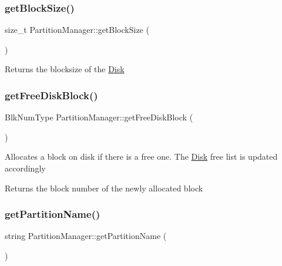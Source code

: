 \subsubsection{\texorpdfstring{get\+Block\+Size()}{getBlockSize()}}
{\footnotesize\ttfamily size\+\_\+t Partition\+Manager\+::get\+Block\+Size (\begin{DoxyParamCaption}{ }\end{DoxyParamCaption})}

\begin{DoxyReturn}{Returns}
the blocksize of the \mbox{\hyperlink{class_disk}{Disk}} 
\end{DoxyReturn}
\mbox{\label{class_partition_manager_a682ce5963a31cf7009455cb1c229b26a}} 
\subsubsection{\texorpdfstring{get\+Free\+Disk\+Block()}{getFreeDiskBlock()}}
{\footnotesize\ttfamily Blk\+Num\+Type Partition\+Manager\+::get\+Free\+Disk\+Block (\begin{DoxyParamCaption}{ }\end{DoxyParamCaption})}

Allocates a block on disk if there is a free one. The \mbox{\hyperlink{class_disk}{Disk}} free list is updated accordingly \begin{DoxyReturn}{Returns}
the block number of the newly allocated block 
\end{DoxyReturn}
\mbox{\label{class_partition_manager_a7c756dba2665e5a7b62b2ccb261f1158}} 
\subsubsection{\texorpdfstring{get\+Partition\+Name()}{getPartitionName()}}
{\footnotesize\ttfamily string Partition\+Manager\+::get\+Partition\+Name (\begin{DoxyParamCaption}{ }\end{DoxyParamCaption})}

